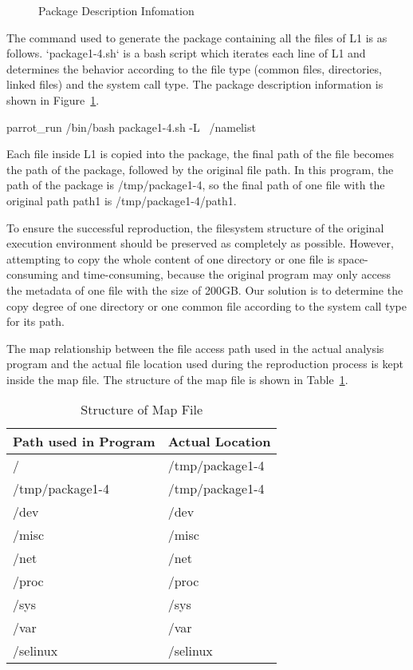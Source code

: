 \documentclass{acm_proc_article-sp}
\begin{document}
\begin{figure}
\centering
{}
\caption{Package Description Infomation}
\label{fig:package-info}
\end{figure}
The command used to generate the package containing all the files of L1 is as follows. 
`package1-4.sh` is a bash script which iterates each line of L1 and
determines the behavior according to the file type (common files, directories,
linked files) and the system call type.
The package description information is shown in Figure~\ref{fig:package-info}.

parrot\_run /bin/bash package1-4.sh -L ~/namelist

Each file inside L1 is copied into the package, the final path of the file becomes the path of the package, followed by the original file path. In this program, the path of the package is /tmp/package1-4, so the final path of one file with the original path path1 is /tmp/package1-4/path1.

To ensure the successful reproduction, the filesystem structure of the original
execution environment should be preserved as completely as possible. However,
attempting to copy the whole content of one directory or one file is
space-consuming and time-consuming, because the original program may only
access the metadata of one file with the size of 200GB. Our solution is to
determine the copy degree of one directory or one common file according to the
system call type for its path.

The map relationship between the file access path used in the actual analysis
program and the actual file location used during the reproduction process is
kept inside the map file. The structure of the map file is shown in Table~\ref{table:map-file}.

\begin{table}
    \centering
    \begin{tabular}{|l|l|}
    \hline
    Path used in Program & Actual Location \\ \hline
    / & /tmp/package1-4 \\ \hline
    /tmp/package1-4 & /tmp/package1-4 \\ \hline
    /dev & /dev \\ \hline
    /misc & /misc\\ \hline
    /net & /net\\ \hline
    /proc & /proc\\ \hline
    /sys & /sys\\ \hline
    /var & /var\\ \hline
    /selinux & /selinux\\ \hline
    \end{tabular}
    \caption{Structure of Map File}
    \label{table:map-file}
\end{table}
\end{document}
